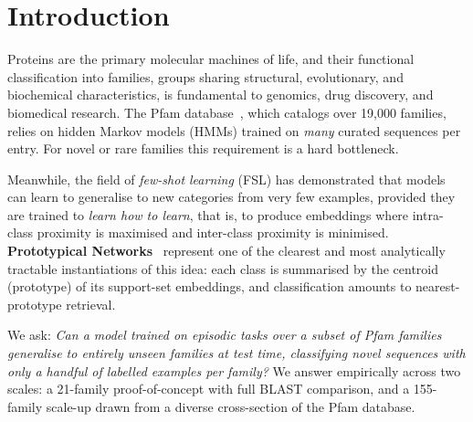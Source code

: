 \documentclass[11pt,a4paper]{article}
\begin{document}
\tableofcontents
\newpage

\section{Introduction}
\label{sec:intro}

Proteins are the primary molecular machines of life, and their functional
classification into families, groups sharing structural, evolutionary, and
biochemical characteristics, is fundamental to genomics, drug discovery, and
biomedical research.  The Pfam database~\cite{mistry2021pfam}, which catalogs
over 19,000 families, relies on hidden Markov models (HMMs) trained on
\emph{many} curated sequences per entry.  For novel or rare families this
requirement is a hard bottleneck.

Meanwhile, the field of \emph{few-shot learning} (FSL) has demonstrated that
models can learn to generalise to new categories from very few examples, provided
they are trained to \emph{learn how to learn}, that is, to produce embeddings
where intra-class proximity is maximised and inter-class proximity is minimised.
\textbf{Prototypical Networks}~\cite{snell2017prototypical} represent one of the
clearest and most analytically tractable instantiations of this idea: each class
is summarised by the centroid (prototype) of its support-set embeddings, and
classification amounts to nearest-prototype retrieval.

We ask: \emph{Can a model trained on episodic tasks over a subset of Pfam
families generalise to entirely unseen families at test time, classifying novel
sequences with only a handful of labelled examples per family?}  We answer
empirically across two scales: a 21-family proof-of-concept with full BLAST
comparison, and a 155-family scale-up drawn from a diverse cross-section of the
Pfam database.
\end{document}
